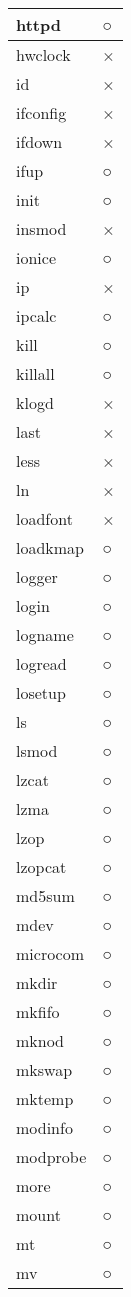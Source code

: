 \begin{longtable}{p{80mm}p{80mm}}
httpd & ○ \\ \hline
hwclock & × \\ \hline
id & × \\ \hline
ifconfig & × \\ \hline
ifdown & × \\ \hline
ifup & ○ \\ \hline
init & ○ \\ \hline
insmod & × \\ \hline
ionice & ○ \\ \hline
ip & × \\ \hline
ipcalc & ○ \\ \hline
kill & ○ \\ \hline
killall & ○ \\ \hline
klogd & × \\ \hline
last & × \\ \hline
less & × \\ \hline
ln & × \\ \hline
loadfont & × \\ \hline
loadkmap & ○ \\ \hline
logger & ○ \\ \hline
login & ○ \\ \hline
logname & ○ \\ \hline
logread & ○ \\ \hline
losetup & ○ \\ \hline
ls & ○ \\ \hline
lsmod & ○ \\ \hline
lzcat & ○ \\ \hline
lzma & ○ \\ \hline
lzop & ○ \\ \hline
lzopcat & ○ \\ \hline
md5sum & ○ \\ \hline
mdev & ○ \\ \hline
microcom & ○ \\ \hline
mkdir & ○ \\ \hline
mkfifo & ○ \\ \hline
mknod & ○ \\ \hline
mkswap & ○ \\ \hline
mktemp & ○ \\ \hline
modinfo & ○ \\ \hline
modprobe & ○ \\ \hline
more & ○ \\ \hline
mount & ○ \\ \hline
mt & ○ \\ \hline
mv & ○ \\ \hline

\end{longtable}
